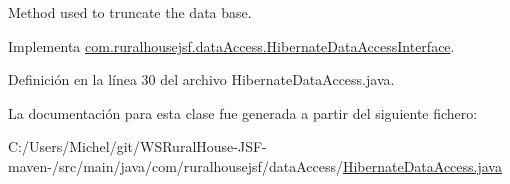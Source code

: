 Method used to truncate the data base. 

Implementa \mbox{\hyperlink{interfacecom_1_1ruralhousejsf_1_1data_access_1_1_hibernate_data_access_interface_a181eb91e600e57fe36301128022f535d}{com.\+ruralhousejsf.\+data\+Access.\+Hibernate\+Data\+Access\+Interface}}.



Definición en la línea 30 del archivo Hibernate\+Data\+Access.\+java.



La documentación para esta clase fue generada a partir del siguiente fichero\+:\begin{DoxyCompactItemize}
\item 
C\+:/\+Users/\+Michel/git/\+W\+S\+Rural\+House-\/\+J\+S\+F-\/maven-\//src/main/java/com/ruralhousejsf/data\+Access/\mbox{\hyperlink{_hibernate_data_access_8java}{Hibernate\+Data\+Access.\+java}}\end{DoxyCompactItemize}
